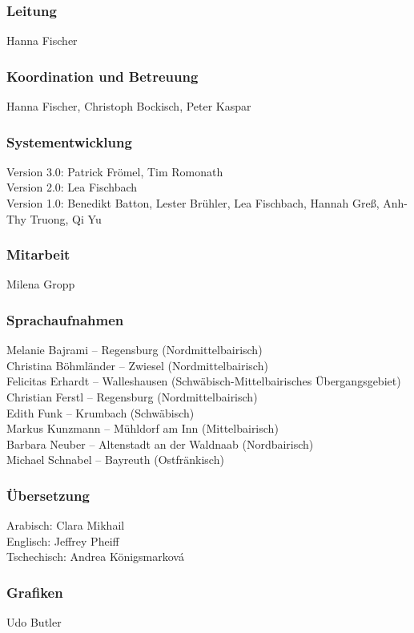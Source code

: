 \subsubsection*{Leitung}
Hanna Fischer
\subsubsection*{Koordination und Betreuung}
Hanna Fischer, Christoph Bockisch, Peter Kaspar 
\subsubsection*{Systementwicklung}
Version 3.0: Patrick Frömel, Tim Romonath\\
Version 2.0: Lea Fischbach\\
Version 1.0: Benedikt Batton, Lester Brühler, Lea Fischbach, Hannah Greß, Anh-Thy Truong, Qi Yu 
\subsubsection*{Mitarbeit}
Milena Gropp
\subsubsection*{Sprachaufnahmen}
Melanie Bajrami – Regensburg (Nordmittelbairisch)\\
Christina Böhmländer – Zwiesel (Nordmittelbairisch)\\
Felicitas Erhardt – Walleshausen (Schwäbisch-Mittelbairisches Übergangsgebiet)\\
Christian Ferstl – Regensburg (Nordmittelbairisch)\\
Edith Funk – Krumbach (Schwäbisch)\\
Markus Kunzmann – Mühldorf am Inn (Mittelbairisch)\\
Barbara Neuber – Altenstadt an der Waldnaab (Nordbairisch)\\
Michael Schnabel – Bayreuth (Ostfränkisch)\\
\subsubsection*{Übersetzung}
Arabisch: Clara Mikhail\\
Englisch: Jeffrey Pheiff\\
Tschechisch: Andrea Königsmarková
\subsubsection*{Grafiken}
Udo Butler

